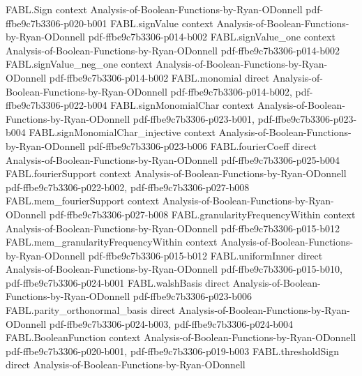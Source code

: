 \begin{theorem}
\proofstep
  {FABL.Sign}
  {context}
  {Analysis-of-Boolean-Functions-by-Ryan-ODonnell}
  {pdf-ffbe9c7b3306-p020-b001}
\proofstep
  {FABL.signValue}
  {context}
  {Analysis-of-Boolean-Functions-by-Ryan-ODonnell}
  {pdf-ffbe9c7b3306-p014-b002}
\proofstep
  {FABL.signValue_one}
  {context}
  {Analysis-of-Boolean-Functions-by-Ryan-ODonnell}
  {pdf-ffbe9c7b3306-p014-b002}
\proofstep
  {FABL.signValue_neg_one}
  {context}
  {Analysis-of-Boolean-Functions-by-Ryan-ODonnell}
  {pdf-ffbe9c7b3306-p014-b002}
\proofstep
  {FABL.monomial}
  {direct}
  {Analysis-of-Boolean-Functions-by-Ryan-ODonnell}
  {pdf-ffbe9c7b3306-p014-b002,
    pdf-ffbe9c7b3306-p022-b004}
\proofstep
  {FABL.signMonomialChar}
  {context}
  {Analysis-of-Boolean-Functions-by-Ryan-ODonnell}
  {pdf-ffbe9c7b3306-p023-b001,
    pdf-ffbe9c7b3306-p023-b004}
\proofstep
  {FABL.signMonomialChar_injective}
  {context}
  {Analysis-of-Boolean-Functions-by-Ryan-ODonnell}
  {pdf-ffbe9c7b3306-p023-b006}
\proofstep
  {FABL.fourierCoeff}
  {direct}
  {Analysis-of-Boolean-Functions-by-Ryan-ODonnell}
  {pdf-ffbe9c7b3306-p025-b004}
\proofstep
  {FABL.fourierSupport}
  {context}
  {Analysis-of-Boolean-Functions-by-Ryan-ODonnell}
  {pdf-ffbe9c7b3306-p022-b002,
    pdf-ffbe9c7b3306-p027-b008}
\proofstep
  {FABL.mem_fourierSupport}
  {context}
  {Analysis-of-Boolean-Functions-by-Ryan-ODonnell}
  {pdf-ffbe9c7b3306-p027-b008}
\proofstep
  {FABL.granularityFrequencyWithin}
  {context}
  {Analysis-of-Boolean-Functions-by-Ryan-ODonnell}
  {pdf-ffbe9c7b3306-p015-b012}
\proofstep
  {FABL.mem_granularityFrequencyWithin}
  {context}
  {Analysis-of-Boolean-Functions-by-Ryan-ODonnell}
  {pdf-ffbe9c7b3306-p015-b012}
\proofstep
  {FABL.uniformInner}
  {direct}
  {Analysis-of-Boolean-Functions-by-Ryan-ODonnell}
  {pdf-ffbe9c7b3306-p015-b010,
    pdf-ffbe9c7b3306-p024-b001}
\proofstep
  {FABL.walshBasis}
  {direct}
  {Analysis-of-Boolean-Functions-by-Ryan-ODonnell}
  {pdf-ffbe9c7b3306-p023-b006}
\proofstep
  {FABL.parity_orthonormal_basis}
  {direct}
  {Analysis-of-Boolean-Functions-by-Ryan-ODonnell}
  {pdf-ffbe9c7b3306-p024-b003,
    pdf-ffbe9c7b3306-p024-b004}
\proofstep
  {FABL.BooleanFunction}
  {context}
  {Analysis-of-Boolean-Functions-by-Ryan-ODonnell}
  {pdf-ffbe9c7b3306-p020-b001,
    pdf-ffbe9c7b3306-p019-b003}
\proofstep
  {FABL.thresholdSign}
  {direct}
  {Analysis-of-Boolean-Functions-by-Ryan-ODonnell}

\end{theorem}
